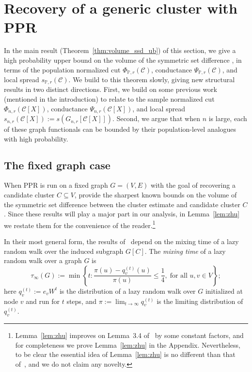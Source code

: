\documentclass[11pt,twoside]{article}
\newcommand{\set}[1]{\left\{#1\right\}}
\newcommand{\1}{\mathbf{1}}
\newcommand{\mc}[1]{\mathcal{#1}}
\newcommand{\Pbb}{\mathbb{P}}
\newcommand{\wh}[1]{\widehat{#1}}
\begin{document}
\section{Recovery of a generic cluster with PPR}
\label{sec:ub_symmetric_set_difference}

In the main result (Theorem~\ref{thm:volume_ssd_ub}) of this section, we give a high probability upper bound on the volume of the symmetric set difference \smash{$\Delta(\wh{C}, \mc{C}[X])$}, in terms of the population normalized cut $\Phi_{\Pbb,r}(\mc{C})$, conductance $\Psi_{\Pbb,r}(\mc{C})$, and local spread $s_{\Pbb,r}(\mc{C})$. We build to this theorem slowly, giving new structural results in two distinct directions. First, we build on some previous work (mentioned in the introduction) to relate \smash{$\Delta(\wh{C}, \mc{C}[X])$} to the sample normalized cut $\Phi_{n,r}(\mc{C}[X])$, conductance $\Psi_{n,r}(\mc{C}[X])$, and local spread $s_{n,r}(\mc{C}[X]) := s(G_{n,r}[\mc{C}[X]])$. Second, we argue that when $n$ is large, each of these graph functionals can be bounded by their population-level analogues with high probability.

\subsection{The fixed graph case}
\label{subsec:ppr_cluster_recovery_fixed_graph}
When PPR is run on a fixed graph $G = (V,E)$ with the goal of recovering a candidate cluster $C \subseteq V$, \cite{zhu2013} provide the sharpest known bounds on the volume of the symmetric set difference between the cluster estimate \smash{$\wh{C}$} and candidate cluster $C$. Since these results will play a major part in our analysis, in Lemma~\ref{lem:zhu} we restate them for the convenience of the reader.\footnote{Lemma~\ref{lem:zhu} improves on Lemma~3.4 of~\cite{zhu2013} by some constant factors, and for completeness we prove Lemma~\ref{lem:zhu} in the Appendix. Nevertheless, to be clear the essential idea of Lemma~\ref{lem:zhu} is no different than that of~\cite{zhu2013}, and we do not claim any novelty.}

In their most general form, the results of~\citet{zhu2013} depend on the mixing time of a lazy random walk over the induced subgraph $G[C]$. The \emph{mixing time} of a lazy random walk over a graph $G$ is
\begin{equation}
\label{eqn:mixing_time}
\tau_{\infty}(G) := \min\set{ t: \frac{{\pi}(u) - {q}_{v}^{(t)}(u)}
	{{\pi}(u)} \leq \frac{1}{4}, \; \text{for all $u,v \in V$}};
\end{equation}
here $q_v^{(t)} := e_v W^t$ is the distribution of a lazy random walk over $G$ initialized at node $v$ and run for $t$ steps, and $\pi := \lim_{t \to \infty} q_v^{(t)}$ is the limiting distribution of $q_v^{(t)}$.
\end{document}
